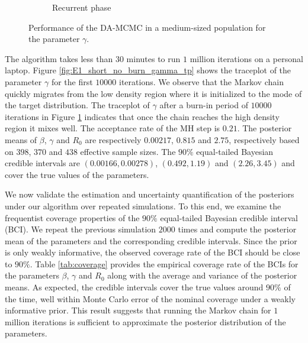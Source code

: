 \documentclass[11pt]{article}
\begin{document}
\begin{figure}
\begin{subfigure}[b]{0.32\textwidth}
			\caption{Recurrent phase}
			\label{fig:E1_burn_gamma_tp}
		\end{subfigure}
		\caption{Performance of the DA-MCMC in a medium-sized population for the parameter $\gamma$.}
		\label{fig:E1}
	\end{figure}
	
	The algorithm takes less than $30$ minutes to run $1$ million iterations on a personal laptop. 
	Figure \ref{fig:E1_short_no_burn_gamma_tp} shows the traceplot of the parameter $\gamma$ for the first $10000$ iterations. We observe that the Markov chain quickly migrates from the low density region where it is initialized to the mode of the target distribution. The traceplot of $\gamma$ after a burn-in period of $10000$ iterations in Figure \ref{fig:E1_burn_gamma_tp} indicates that once the chain reaches the high density region it mixes well. The acceptance rate of the MH step is $0.21$.
	The posterior means of $\beta$, $\gamma$ and $R_0$ are respectively $0.00217$, $0.815$ and $2.75$, respectively based on $398$, $370$ and $438$ effective sample sizes. The $90\%$ equal-tailed Bayesian credible intervals are $(0.00166, 0.00278)$, $(0.492, 1.19)$ and $(2.26, 3.45)$ and cover the true values of the parameters. 
	
	We now validate the estimation and uncertainty quantification of the posteriors under our algorithm over repeated simulations. To this end, we examine the frequentist coverage properties of the $90\%$ equal-tailed Bayesian credible interval (BCI). We repeat the previous simulation $2000$ times and compute the posterior mean of the parameters and the corresponding credible intervals. Since the prior is only weakly informative, the observed coverage rate of the BCI should be close to $90\%$.
	Table \ref{tab:coverage} provides the empirical coverage rate of the BCIs for the parameters $\beta$, $\gamma$ and $R_0$ along with the average and variance of the posterior means. As expected, the credible intervals cover the true values around $90\%$ of the time, well within Monte Carlo error of the nominal coverage under a weakly informative prior. This result suggests that running the Markov chain for $1$ million iterations is sufficient to approximate the posterior distribution of the parameters.
	
\end{document}
